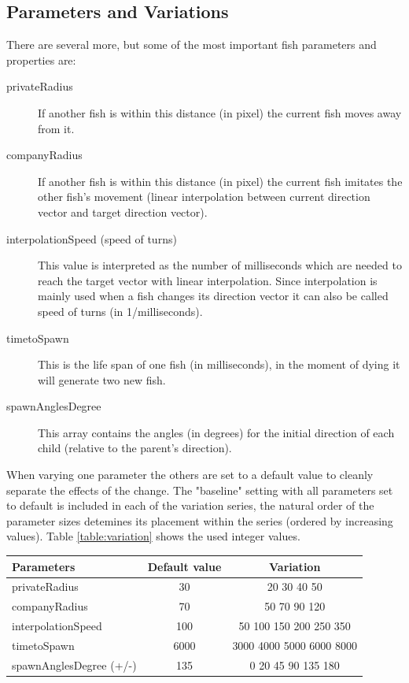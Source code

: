 \documentclass{scrartcl}
\begin{document}
\subsection{Parameters and Variations}
There are several more, but some of the most important fish parameters and properties are:
\begin{description}
\item[privateRadius] If another fish is within this distance (in pixel) the current fish moves away from it.
\item[companyRadius] If another fish is within this distance (in pixel) the current fish imitates the other fish's movement (linear interpolation between current direction vector and target direction vector).
\item[interpolationSpeed (speed of turns)] This value is interpreted as the number of milliseconds which are needed to reach the target vector with linear interpolation. Since interpolation is mainly used when a fish changes its direction vector it can also be called speed of turns (in 1/milliseconds).
\item[timetoSpawn] This is the life span of one fish (in milliseconds), in the moment of dying it will generate two new fish.
\item[spawnAnglesDegree] This array contains the angles (in degrees) for the initial direction of each child (relative to the parent's direction).
\end{description}

When varying one parameter the others are set to a default value to cleanly separate the effects of the change.
The "baseline" setting with all parameters set to default is included in each of the variation series, the natural order of the parameter sizes detemines its placement within the series (ordered by increasing values). Table \ref{table:variation} shows the used integer values.

\begin{center}
\begin{tabular}{ l | c | c }
  \hline                       
  Parameters 		 & Default value 	& Variation \\
  \hline
  privateRadius 	 & 30 		& 20 30 40 50 \\
  companyRadius 	 & 70 		& 50 70 90 120 \\
  interpolationSpeed & 100 		& 50 100 150 200 250 350 \\
  timetoSpawn 		 & 6000 	& 3000 4000 5000 6000 8000 \\
  spawnAnglesDegree (+/-)  & 135 	& 0 20 45 90 135 180 \\
  \hline  
\end{tabular}
\label{table:variation}
\end{center}
\end{document}
